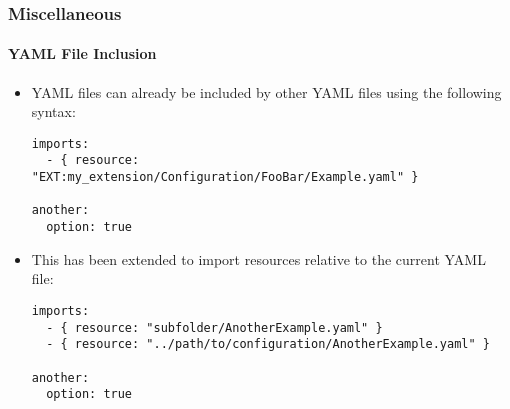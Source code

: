 
\begin{frame}[fragile]
	\frametitle{Miscellaneous}
	\framesubtitle{YAML File Inclusion}

	\lstset{basicstyle=\tiny\ttfamily}

	\begin{itemize}
		\item YAML files can already be included by other YAML files using the following syntax:

\begin{lstlisting}
imports:
  - { resource: "EXT:my_extension/Configuration/FooBar/Example.yaml" }

another:
  option: true
\end{lstlisting}

		\item This has been extended to import resources relative to the current YAML file:

\begin{lstlisting}
imports:
  - { resource: "subfolder/AnotherExample.yaml" }
  - { resource: "../path/to/configuration/AnotherExample.yaml" }

another:
  option: true
\end{lstlisting}

	\end{itemize}

\end{frame}

